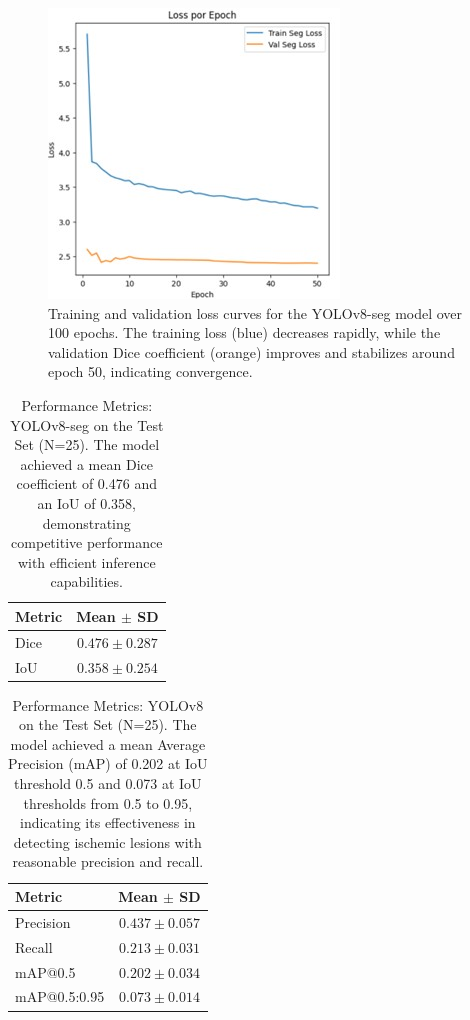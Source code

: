 \documentclass[12pt]{article}
\begin{document}
\begin{figure}[tp]
    \centering
    \includegraphics[width=.7\textwidth]{figures/Figure 5.jpg}
    \caption{Training and validation loss curves for the YOLOv8-seg model over 100 epochs. The training loss (blue) decreases rapidly, while the validation Dice coefficient (orange) improves and stabilizes around epoch 50, indicating convergence.}\label{fig:yolov8_loss_curve}
\end{figure}

\begin{table}[tp]
\centering
\begin{tabular}{lc}
\toprule
Metric & Mean $\pm$ SD \\
\midrule
Dice & $0.476 \pm 0.287$ \\
IoU & $0.358 \pm 0.254$ \\
\bottomrule
\end{tabular}
\caption{Performance Metrics: YOLOv8-seg on the Test Set (N=25). The model achieved a mean Dice coefficient of 0.476 and an IoU of 0.358, demonstrating competitive performance with efficient inference capabilities.}\label{tab:yolov8_metrics}
\end{table}

\begin{table}[tp]
\centering
\begin{tabular}{lc}
\toprule
Metric & Mean $\pm$ SD \\
\midrule
Precision & $0.437 \pm 0.057$ \\
Recall & $0.213 \pm 0.031$ \\
mAP@0.5 & $0.202 \pm 0.034$ \\
mAP@0.5:0.95 & $0.073 \pm 0.014$ \\
\bottomrule
\end{tabular}
\caption{Performance Metrics: YOLOv8 on the Test Set (N=25). The model achieved a mean Average Precision (mAP) of 0.202 at IoU threshold 0.5 and 0.073 at IoU thresholds from 0.5 to 0.95, indicating its effectiveness in detecting ischemic lesions with reasonable precision and recall.}\label{tab:yolov8_detection_metrics}
\end{table}
\end{document}
